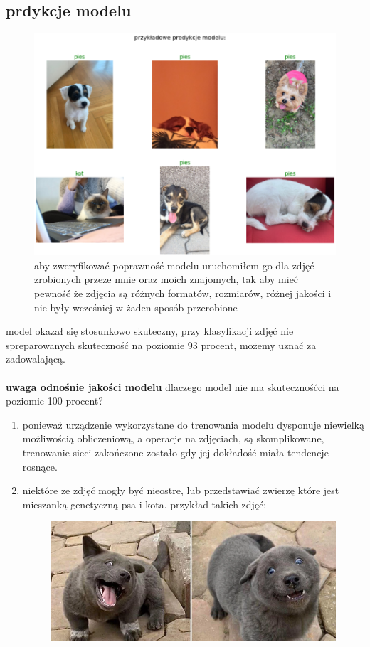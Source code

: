 \documentclass[a4paper,12pt]{scrartcl}
\begin{document}
\subsection{prdykcje modelu}
\begin{figure}[h]
  \includegraphics[width=\linewidth]{preedictions.png}
  aby zweryfikować poprawność modelu uruchomiłem go dla zdjęć zrobionych przeze mnie oraz moich znajomych,
  tak aby mieć pewność że zdjęcia są różnych formatów, rozmiarów, różnej jakości i nie 
  były wcześniej w żaden sposób przerobione
\end{figure}
model okazał się stosunkowo skuteczny, przy klasyfikacji 
zdjęć nie spreparowanych skuteczność na poziomie 93 
procent, możemy uznać za zadowalającą.\\\\
\textbf{uwaga odnośnie jakości modelu}
{dlaczego model nie ma skutecznośćci na poziomie 100 procent?}\\
\begin{enumerate}
  \item ponieważ urządzenie wykorzystane do trenowania modelu dysponuje niewielką możliwością obliczeniową,
   a operacje na zdjęciach, są skomplikowane, trenowanie sieci zakończone zostało gdy jej dokładość miała tendencje 
   rosnące.
  \item niektóre ze zdjęć mogły być nieostre, lub przedstawiać zwierzę które jest mieszanką genetyczną psa i kota.
  przykład takich zdjęć: 
  \begin{figure}[h]
    \includegraphics[width=\linewidth]{example.png}
  \end{figure}
\end{enumerate} 
\end{document}
